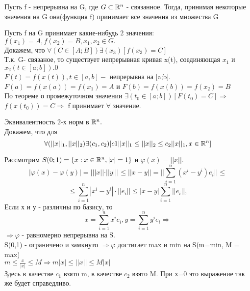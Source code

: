 \begin{teorema}
Пусть f - непрерывна на G, где $G\subset\mathbb{R}^n$ - связанное. Тогда, принимая некоторые значения на G она(функция f) принимает все значения из множества G
\end{teorema}
\dokvo
Пусть f на G принимает какие-нибудь 2 значения: $f(x_1) = A, f(x_2) = B, x_1,x_2\in G.$
\\
Докажем, что $\forall(C\in[A;B])\exists(x_3)[f(x_3)=C]$
\\
Т.к. G- связаное, то существует непрерывная кривая x(t), соединяющая $x_1$ и $x_2(t\in[a;b]).0$
\\
$F(t)=f(x(t)), t\in[a,b] -$ непрерывна на [a;b].
\\
$F(a)=f(x(a)) = f(x_1) = A$ и $F(b)=f(x(b))=f(x_2)=B$
\\
По теореме о промежуточном значении $\exists(t_0\in[a;b])[F(t_0)=C] \Rightarrow$
\\
$f(x(t_0))=C\Rightarrow$ f принимает $\forall$ значение.
\dokno

\begin{teorema}
Эквивалентность 2-х норм в $\mathbb{R}^n.$\\
Докажем, что для
$$
\forall(||x||_1,||x||_2)\exists(c_1,c_2)[c1||x||_1\le||x||_2\le c_2||x||_1, x\in\mathbb{R}^n]
$$
\end{teorema}

\dokvo
Рассмотрим $S(0;1)=\{x:x\in\mathbb{R}^n, |x|=1\}$ и $\varphi(x)=||x||.$
\\
$$|\varphi(x)-\varphi(y)|=| ||x||\cdot||y|| |\le ||x-y|| = ||\sum_{i=1}^{n}(x^i - y^i)e_i||\le$$
$$
\le \sum_{i=1}^{n}|x^i - y^i|\cdot||e_i||\le|x-y|\sum_{i=1}^{n}||e_i||,
$$
Если х и у - различны по базису, то
$$
x = \sum_{i=1}^{n}x^i e_i, y = \sum_{i=1}^{n}y^i e_i\Rightarrow
$$
$\Rightarrow \varphi$ - равномерно непрерывна на S.
\\
S(0,1) - ограничено и замкнуто $\Rightarrow\varphi$ достигает max и min на S(m=min, M = max)
\\
$m\le\frac{x}{|x|}\le M\Rightarrow m|x|\le||x||\le M|x|$
\\
Здесь в качестве $c_1$ взято m, в качестве $c_2$ взято M. При х=0 это выражение так же будет справедливо.
